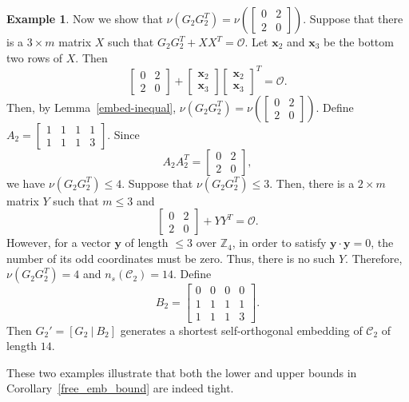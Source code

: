 \documentclass{article}
\theoremstyle{definition}
\newtheorem{example}{Example}[section]
\theoremstyle{remark}
\begin{document}
\begin{example}
    Now we show that $\nu(G_2G_2^T)=\nu\left(\begin{bmatrix} 0 & 2\\2 & 0\end{bmatrix}\right)$.
    Suppose that there is a $3\times m$ matrix $X$ such that $G_2G_2^T+XX^T=\mathcal{O}$. Let $\mathbf{x}_2$ and $\mathbf{x}_3$ be the bottom two rows of $X$. Then
    \[
    \begin{bmatrix}
       0 & 2\\2 & 0
    \end{bmatrix}+
    \begin{bmatrix}
    \mathbf{x}_2\\\mathbf{x}_3
    \end{bmatrix}
    \begin{bmatrix}
    \mathbf{x}_2\\\mathbf{x}_3
    \end{bmatrix}^T=\mathcal{O}.
    \]
    Then, by Lemma~\ref{embed-inequal}, $\nu(G_2G_2^T)=\nu\left(\begin{bmatrix} 0 & 2\\2 & 0\end{bmatrix}\right)$. Define $A_2=\begin{bmatrix}
        1 & 1 & 1 & 1\\1 & 1 & 1 & 3
    \end{bmatrix}$. Since 
    \[
    A_2A_2^T=\begin{bmatrix}
       0 & 2\\2 & 0
    \end{bmatrix},
    \]
    we have $\nu(G_2G_2^T)\le 4$. Suppose that $\nu(G_2G_2^T)\le 3$. Then, there is a $2\times m$ matrix $Y$ such that $m\le 3$ and
    \[
    \begin{bmatrix}
       0 & 2\\2 & 0
    \end{bmatrix}+YY^T=\mathcal{O}.
    \]
    However, for a vector $\mathbf{y}$ of length $\le 3$ over $\mathbb{Z}_4$, in order to satisfy $\mathbf{y}\cdot\mathbf{y}=0$, the number of its odd coordinates must be zero. Thus, there is no such $Y$. Therefore, $\nu(G_2G_2^T)=4$ and $n_s(\mathcal{C}_2)=14$. Define
    \[
    B_2=\begin{bmatrix}
        0 & 0 & 0 & 0\\1 & 1 & 1 & 1\\1 & 1 & 1 & 3
    \end{bmatrix}.
    \]
    Then $G_2'=[G_2~|~B_2]$ generates a shortest self-orthogonal embedding of $\mathcal{C}_2$ of length $14$.

    These two examples illustrate that both the lower and upper bounds in Corollary~\ref{free_emb_bound} are indeed tight.
\end{example}
\end{document}

